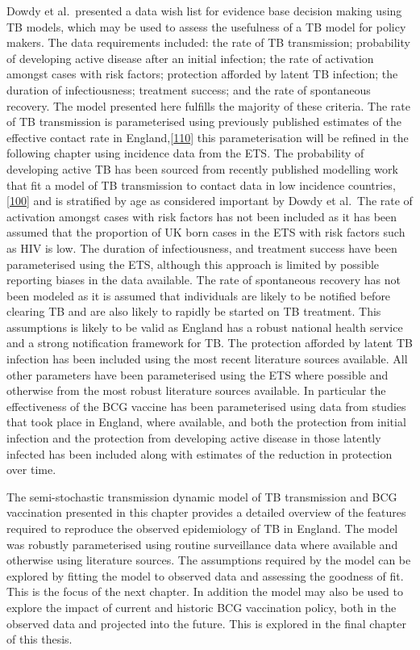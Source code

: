 \documentclass[11pt,twoside]{bristolthesis}
\begin{document}
  Dowdy et al.~presented a data wish list for evidence base decision making using TB models, which may be used to assess the usefulness of a TB model for policy makers. The data requirements included: the rate of TB transmission; probability of developing active disease after an initial infection; the rate of activation amongst cases with risk factors; protection afforded by latent TB infection; the duration of infectiousness; treatment success; and the rate of spontaneous recovery. The model presented here fulfills the majority of these criteria. The rate of TB transmission is parameterised using previously published estimates of the effective contact rate in England,{[}\protect\hyperlink{ref-Vynnycky1999}{110}{]} this parameterisation will be refined in the following chapter using incidence data from the ETS. The probability of developing active TB has been sourced from recently published modelling work that fit a model of TB transmission to contact data in low incidence countries,{[}\protect\hyperlink{ref-Ragonnet2017}{100}{]} and is stratified by age as considered important by Dowdy et al.~The rate of activation amongst cases with risk factors has not been included as it has been assumed that the proportion of UK born cases in the ETS with risk factors such as HIV is low. The duration of infectiousness, and treatment success have been parameterised using the ETS, although this approach is limited by possible reporting biases in the data available. The rate of spontaneous recovery has not been modeled as it is assumed that individuals are likely to be notified before clearing TB and are also likely to rapidly be started on TB treatment. This assumptions is likely to be valid as England has a robust national health service and a strong notification framework for TB. The protection afforded by latent TB infection has been included using the most recent literature sources available. All other parameters have been parameterised using the ETS where possible and otherwise from the most robust literature sources available. In particular the effectiveness of the BCG vaccine has been parameterised using data from studies that took place in England, where available, and both the protection from initial infection and the protection from developing active disease in those latently infected has been included along with estimates of the reduction in protection over time.
  
  The semi-stochastic transmission dynamic model of TB transmission and BCG vaccination presented in this chapter provides a detailed overview of the features required to reproduce the observed epidemiology of TB in England. The model was robustly parameterised using routine surveillance data where available and otherwise using literature sources. The assumptions required by the model can be explored by fitting the model to observed data and assessing the goodness of fit. This is the focus of the next chapter. In addition the model may also be used to explore the impact of current and historic BCG vaccination policy, both in the observed data and projected into the future. This is explored in the final chapter of this thesis.
  
\end{document}
